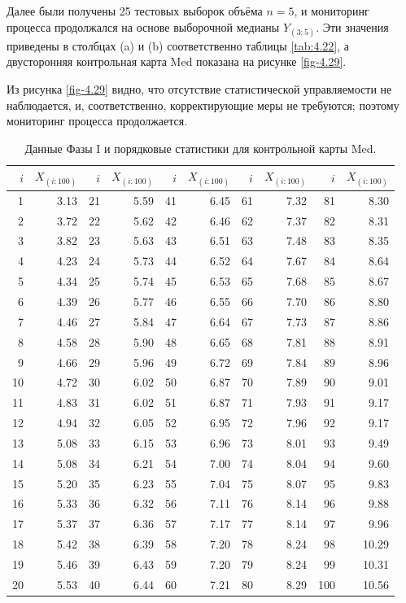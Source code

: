 Далее были получены 25 тестовых выборок объёма \(n = 5\), и мониторинг процесса продолжался на основе выборочной медианы \(Y_{(3:5)}\). Эти значения приведены в столбцах (a) и (b) соответственно таблицы \ref{tab:4.22}, а двусторонняя контрольная карта Med показана на рисунке \ref{fig-4.29}.

Из рисунка \ref{fig-4.29} видно, что отсутствие статистической управляемости не наблюдается, и, соответственно, корректирующие меры не требуются; поэтому мониторинг процесса продолжается.

\begin{table}[!ht]
	\centering
	\caption{Данные Фазы I и порядковые статистики для контрольной карты Med.}
	\label{tab:4.21}
	\small
	\begin{tabular}{@{}rrrrrrrrrr@{}}
		\toprule
		\(i\) & \(X_{(i:100)}\) & \(i\) & \(X_{(i:100)}\) & \(i\) & \(X_{(i:100)}\) & \(i\) & \(X_{(i:100)}\) & \(i\) & \(X_{(i:100)}\) \\
		\midrule
		1 & 3.13 & 21 & 5.59 & 41 & 6.45 & 61 & 7.32 & 81 & 8.30 \\
		2 & 3.72 & 22 & 5.62 & 42 & 6.46 & 62 & 7.37 & 82 & 8.31 \\
		3 & 3.82 & 23 & 5.63 & 43 & 6.51 & 63 & 7.48 & 83 & 8.35 \\
		4 & 4.23 & 24 & 5.73 & 44 & 6.52 & 64 & 7.67 & 84 & 8.64 \\
		5 & 4.34 & 25 & 5.74 & 45 & 6.53 & 65 & 7.68 & 85 & 8.67 \\
		6 & 4.39 & 26 & 5.77 & 46 & 6.55 & 66 & 7.70 & 86 & 8.80 \\
		7 & 4.46 & 27 & 5.84 & 47 & 6.64 & 67 & 7.73 & 87 & 8.86 \\
		8 & 4.58 & 28 & 5.90 & 48 & 6.65 & 68 & 7.81 & 88 & 8.91 \\
		9 & 4.66 & 29 & 5.96 & 49 & 6.72 & 69 & 7.84 & 89 & 8.96 \\
		10 & 4.72 & 30 & 6.02 & 50 & 6.87 & 70 & 7.89 & 90 & 9.01 \\
		11 & 4.83 & 31 & 6.02 & 51 & 6.87 & 71 & 7.93 & 91 & 9.17 \\
		12 & 4.94 & 32 & 6.05 & 52 & 6.95 & 72 & 7.96 & 92 & 9.17 \\
		13 & 5.08 & 33 & 6.15 & 53 & 6.96 & 73 & 8.01 & 93 & 9.49 \\
		14 & 5.08 & 34 & 6.21 & 54 & 7.00 & 74 & 8.04 & 94 & 9.60 \\
		15 & 5.20 & 35 & 6.23 & 55 & 7.04 & 75 & 8.07 & 95 & 9.83 \\
		16 & 5.33 & 36 & 6.32 & 56 & 7.11 & 76 & 8.14 & 96 & 9.88 \\
		17 & 5.37 & 37 & 6.36 & 57 & 7.17 & 77 & 8.14 & 97 & 9.96 \\
		18 & 5.42 & 38 & 6.39 & 58 & 7.20 & 78 & 8.24 & 98 & 10.29 \\
		19 & 5.46 & 39 & 6.43 & 59 & 7.20 & 79 & 8.24 & 99 & 10.31 \\
		20 & 5.53 & 40 & 6.44 & 60 & 7.21 & 80 & 8.29 & 100 & 10.56 \\
		\bottomrule
	\end{tabular}
\end{table}

